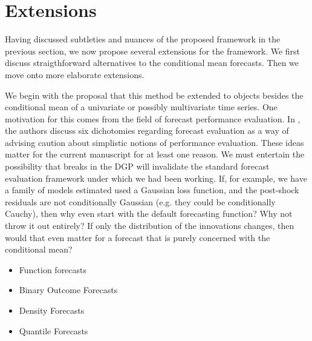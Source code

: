 \documentclass{uiucthesis2021}
\theoremstyle{definition}
\begin{document}
  
  
  \section{Extensions}\label{Extensions}

  Having discussed subtleties and nuances of the proposed framework in the previous section, we now propose several extensions for the framework.  We first discuss straigthforward alternatives to the conditional mean forecasts.  Then we move onto more elaborate extensions.

  We begin with the proposal that this method be extended to objects besides the conditional mean of a univariate or possibly multivariate time series.  One motivation for this comes from the field of forecast performance evaluation.  In \cite[][]{clements2005evaluating}, the authors discuss six dichotomies regarding forecast evaluation as a way of advising caution about simplistic notions of performance evaluation.  These ideas matter for the current manuscript for at least one reason.  We must entertain the possibility that breaks in the DGP will invalidate the standard forecast evaluation framework under which we had been working.  If, for example, we have a family of models estimated used a Gaussian loss function, and the post-shock residuals are not conditionally Gaussian (e.g. they could be conditionally Cauchy), then why even start with the default forecasting function?  Why not throw it out entirely?  If only the distribution of the innovations changes, then would that even matter for a forecast that is purely concerned with the conditional mean?

  \begin{itemize}
    \item Function forecasts
    \item Binary Outcome Forecasts
    \item Density Forecasts
    \item Quantile Forecasts
  \end{itemize}
\end{document}
